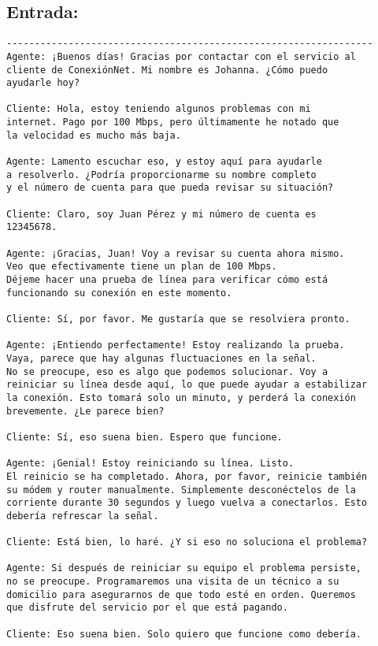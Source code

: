 \documentclass[12pt,a4paper]{scrartcl} %
\begin{document}
\subsection*{Entrada:}
\begin{verbatim}
-----------------------------------------------------------------    
Agente: ¡Buenos días! Gracias por contactar con el servicio al 
cliente de ConexiónNet. Mi nombre es Johanna. ¿Cómo puedo 
ayudarle hoy?

Cliente: Hola, estoy teniendo algunos problemas con mi 
internet. Pago por 100 Mbps, pero últimamente he notado que 
la velocidad es mucho más baja.

Agente: Lamento escuchar eso, y estoy aquí para ayudarle 
a resolverlo. ¿Podría proporcionarme su nombre completo 
y el número de cuenta para que pueda revisar su situación?

Cliente: Claro, soy Juan Pérez y mi número de cuenta es 
12345678.

Agente: ¡Gracias, Juan! Voy a revisar su cuenta ahora mismo.
Veo que efectivamente tiene un plan de 100 Mbps. 
Déjeme hacer una prueba de línea para verificar cómo está 
funcionando su conexión en este momento.

Cliente: Sí, por favor. Me gustaría que se resolviera pronto.

Agente: ¡Entiendo perfectamente! Estoy realizando la prueba.
Vaya, parece que hay algunas fluctuaciones en la señal. 
No se preocupe, eso es algo que podemos solucionar. Voy a 
reiniciar su línea desde aquí, lo que puede ayudar a estabilizar 
la conexión. Esto tomará solo un minuto, y perderá la conexión 
brevemente. ¿Le parece bien?

Cliente: Sí, eso suena bien. Espero que funcione.

Agente: ¡Genial! Estoy reiniciando su línea. Listo. 
El reinicio se ha completado. Ahora, por favor, reinicie también 
su módem y router manualmente. Simplemente desconéctelos de la 
corriente durante 30 segundos y luego vuelva a conectarlos. Esto 
debería refrescar la señal.

Cliente: Está bien, lo haré. ¿Y si eso no soluciona el problema?

Agente: Si después de reiniciar su equipo el problema persiste, 
no se preocupe. Programaremos una visita de un técnico a su 
domicilio para asegurarnos de que todo esté en orden. Queremos 
que disfrute del servicio por el que está pagando.

Cliente: Eso suena bien. Solo quiero que funcione como debería.


\end{verbatim}
\end{document}
